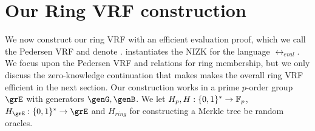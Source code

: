 \vspace{-6mm}
\section{Our Ring VRF construction}%
\label{sec:pederson_vrf}

We now construct our  ring VRF with an efficient evaluation proof, which
we call the Pedersen VRF and denote \PedVRF.
\PedVRF instantiates the NIZK for the language $\rel_{eval}$.
We focus upon the Pedersen VRF and relations 
for ring membership, but we only discuss the zero-knowledge continuation
that makes makes the overall ring VRF efficient in the next section.
Our construction works in a prime $ p $-order group $ \grE $ with generators $ \genG,\genB $. We let $H_p,H : \{0,1\}^* \to \mathbb{F}_p$, $H_{\grE} : \{0,1\}^* \to \grE$ and $ H_{ring} $ for constructing a Merkle tree 
be  random oracles.

